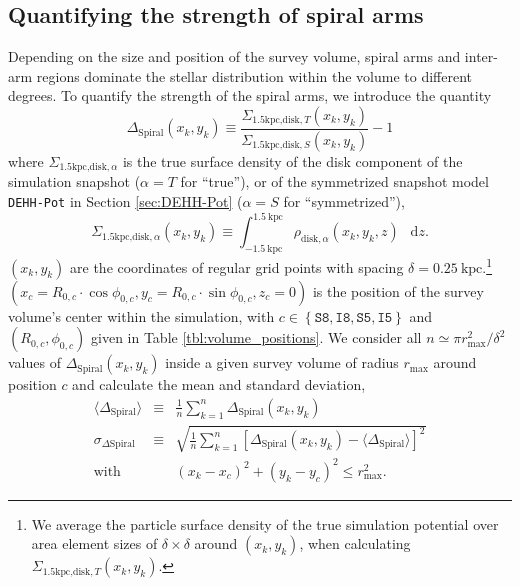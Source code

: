 \documentclass[iop,revtex4,numberedappendix,appendixfloats]{emulateapj}
\newcommand*\diff{\mathop{}\!\mathrm{d}}
\newcommand{\OLD}[1]{}
\begin{document}
\subsection{Quantifying the strength of spiral arms} \label{sec:spiral_arm_DeltaS}

Depending on the size and position of the survey volume, spiral arms and inter-arm regions dominate the stellar distribution within the volume to different degrees. To quantify the strength of the spiral arms, we introduce the quantity
\begin{equation}
\Delta_\text{Spiral} (x_k,y_k) \equiv \frac{\Sigma_{\text{1.5kpc,disk},T}(x_k,y_k)}{\Sigma_{\text{1.5kpc,disk},S}(x_k,y_k)} -1\label{eq:DeltaS_definition}
\end{equation}
where $\Sigma_{\text{1.5kpc,disk},\alpha}$ is the true surface density of the disk component of the simulation snapshot ($\alpha=T$ for ``true''), or of the symmetrized snapshot model \texttt{DEHH-Pot} in Section \ref{sec:DEHH-Pot} ($\alpha=S$ for ``symmetrized''),
\begin{equation}
\Sigma_{\text{1.5kpc,disk},\alpha}(x_k,y_k) \equiv \int_{-1.5~\text{kpc}}^{1.5~\text{kpc}} \rho_{\text{disk},\alpha}(x_k,y_k,z) \ \diff z.
\end{equation}
$(x_k,y_k)$ are the coordinates of regular grid points with spacing $\delta=0.25~\text{kpc}$.\footnote{We average the particle surface density of the true simulation potential over area element sizes of $\delta \times \delta$ around $(x_k,y_k)$, when calculating $\Sigma_{\text{1.5kpc,disk},T}(x_k,y_k)$.} $(x_c=R_{0,c} \cdot \cos \phi_{0,c},y_c=R_{0,c} \cdot \sin \phi_{0,c},z_c=0)$ is the position of the survey volume's center within the simulation, with $c\in\left\{ \texttt{S8},\texttt{I8},\texttt{S5},\texttt{I5}\right\}$ and $(R_{0,c},\phi_{0,c})$ given in Table \ref{tbl:volume_positions}. We consider all $n \simeq \pi r_\text{max}^2/\OLD{4}\delta^2$ values of $\Delta_\text{Spiral} (x_k,y_k)$ inside a given survey volume of radius $r_\text{max}$ around position $c$ and calculate the mean and standard deviation,
\begin{eqnarray}
\langle \Delta_\text{Spiral} \rangle \OLD{&\equiv& \langle \Delta_\text{Spiral} (r \leq r_\text{max} \mid c) \rangle \nonumber\\}
&\equiv & \frac 1n \sum_{k=1}^n \Delta_\text{Spiral}(x_k,y_k)\label{eq:mean_DeltaS}\\
\sigma_{\Delta\text{Spiral}} \OLD{&\equiv& \sigma[\Delta_\text{Spiral}(r \leq r_\text{max} \mid c)]  \nonumber\\}
&\equiv &  \sqrt{\frac 1n \sum_{k=1}^{n} \left[ \Delta_\text{Spiral}(x_k,y_k) -  \langle \Delta_\text{Spiral} \rangle \right]^2}\label{eq:std_DeltaS}\\
 \text{with } && (x_k-x_c)^2 + (y_k-y_c)^2 \leq r_\text{max}^2.
\end{eqnarray}
\end{document}
